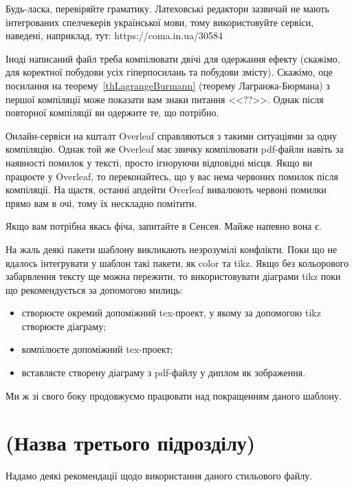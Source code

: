 \begin{corollary} \par %
Будь-ласка, перевіряйте граматику. Латеховські редактори зазвичай не мають 
інтегрованих спелчекерів української мови, тому використовуйте сервіси, 
наведені, наприклад, тут: https://coma.in.ua/30584
\end{corollary}

Іноді написаний файл треба компілювати двічі для одержання ефекту 
(скажімо, для коректної побудови усіх гіперпосилань та побудови змісту). 
Скажімо, оце посилання на теорему~\ref{thLagrangeBurmann} (теорему 
Лагранжа-Бюрмана) з першої компіляції може показати вам знаки питання 
<<??>>. Однак після повторної компіляції ви одержите те, що потрібно.

Онлайн-сервіси на кшталт Overleaf справляються з такими ситуаціями за одну компіляцію. Однак той 
же Overleaf має звичку компілювати pdf-файли навіть за наявності помилок у 
тексті, просто ігноруючи відповідні місця. Якщо ви працюєте у Overleaf, 
то переконайтесь, що у вас нема червоних помилок після компіляції. На 
щастя, останні апдейти Overleaf вивалюють червоні помилки прямо вам в очі, 
тому їх нескладно помітити.

Якщо вам потрібна якась фіча, запитайте в Сенсея. Майже напевно вона є.

На жаль деякі пакети шаблону викликають незрозумілі конфлікти. Поки що не 
вдалось інтегрувати у шаблон такі пакети, як color та tikz. Якщо без 
кольорового забарвлення тексту ще можна пережити, то використовувати 
діаграми tikz поки що рекомендується за допомогою милиць:

\begin{itemize}
\item створюєте окремий допоміжний tex-проект, у якому за допомогою tikz створюєте 
діаграму;
\item компілюєте допоміжний tex-проект;
\item вставляєте створену діаграму з pdf-файлу у диплом як зображення.
\end{itemize}

Ми ж зі свого боку продовжуємо працювати над покращенням даного шаблону.

\section{(Назва третього підрозділу)}


Надамо деякі рекомендації щодо використання даного стильового файлу.

